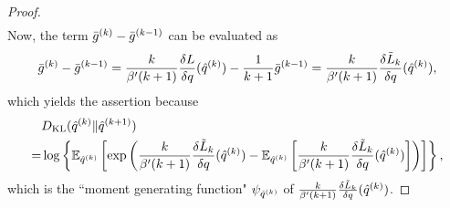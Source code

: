 \begin{proof}
\begin{align}
\end{align}
Now, the term $\bar{g}^{(k)} - \bar{g}^{(k-1)}$ can be evaluated as 
$$\bar{g}^{(k)} - \bar{g}^{(k-1)} = \frac{k}{\beta' (k+1)} \frac{\delta L}{\delta q}(\hat{q}^{(k)}) - \frac{1}{k+1}  \bar{g}^{(k-1)}
 =  \frac{k}{\beta' (k+1)} \frac{\delta \tilde{L}_k}{\delta q}(\hat{q}^{(k)}),
$$
which yields the assertion because 
\begin{align}
    &D_{\mathrm{KL}}(\hat{q}^{(k)} \| \hat{q}^{(k+1)})\\
    =& \log\left\{\mathbb{E}_{\hat{q}^{(k)}}\left[\exp\left( \frac{k}{\beta' (k+1)} \frac{\delta \tilde{L}_k}{\delta q}(\hat{q}^{(k)}) -\mathbb{E}_{\hat{q}^{(k)}}\left[\frac{k}{\beta' (k+1)} \frac{\delta \tilde{L}_k}{\delta q}(\hat{q}^{(k)})\right]\right)\right]\right\},
\end{align}
which is the ``moment generating function" $\psi_{\hat{q}^{(k)}}$ of $\frac{k}{\beta' (k+1)} \frac{\delta \tilde{L}_k}{\delta q}(\hat{q}^{(k)})$.
%

\end{proof}
